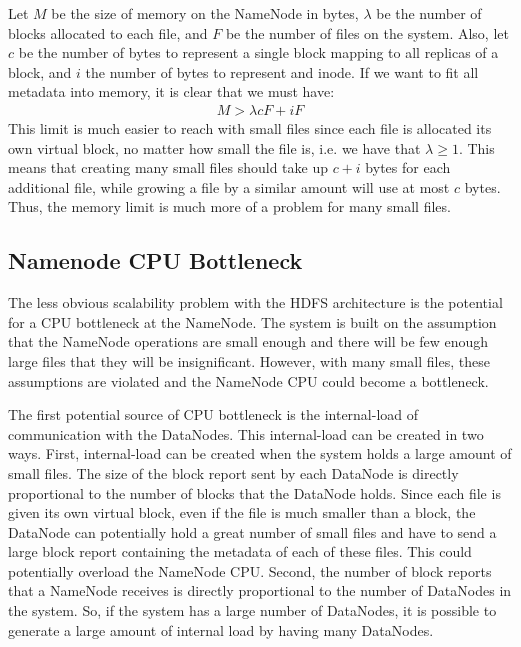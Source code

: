 \documentclass[11pt, a4paper]{article}
\begin{document}
\begin{multicols*}{2}
Let $ M $ be the size of memory on the NameNode in bytes, $ \lambda $ be the number of blocks allocated to each file, and $ F $ be the number of files on the system. Also, let $ c $ be the number of bytes to represent a single block mapping to all replicas of a block, and $ i $ the number of bytes to represent and inode. If we want to fit all metadata into memory, it is clear that we must have:
\begin{align*}
	M > \lambda c F + i F
\end{align*}
	This limit is much easier to reach with small files since each file is allocated its own virtual block, no matter how small the file is, i.e. we have that $ \lambda \geq 1$. This means that creating many small files should take up $ c + i$ bytes for each additional file, while growing a file by a similar amount will use at most $ c $ bytes. Thus, the memory limit is much more of a problem for many small files. 

\subsection{Namenode CPU Bottleneck}
The less obvious scalability problem with the HDFS architecture is the potential for a CPU bottleneck at the NameNode. The system is built on the assumption that the NameNode operations are small enough and there will be few enough large files that they will be insignificant. However, with many small files, these assumptions are violated and the NameNode CPU could become a bottleneck. 


The first potential source of CPU bottleneck is the internal-load of communication with the DataNodes. This internal-load can be created in two ways. First, internal-load can be created when the system holds a large amount of small files. The size of the block report sent by each DataNode is directly proportional to the number of blocks that the DataNode holds. Since each file is given its own virtual block, even if the file is much smaller than a block, the DataNode can potentially hold a great number of small files and have to send a large block report containing the metadata of each of these files. This could potentially overload the NameNode CPU. 
Second, the number of block reports that a NameNode receives is directly proportional to the number of DataNodes in the system. So, if the system has a large number of DataNodes, it is possible to generate a large amount of internal load by having many DataNodes.  



\end{multicols*}
\end{document}
